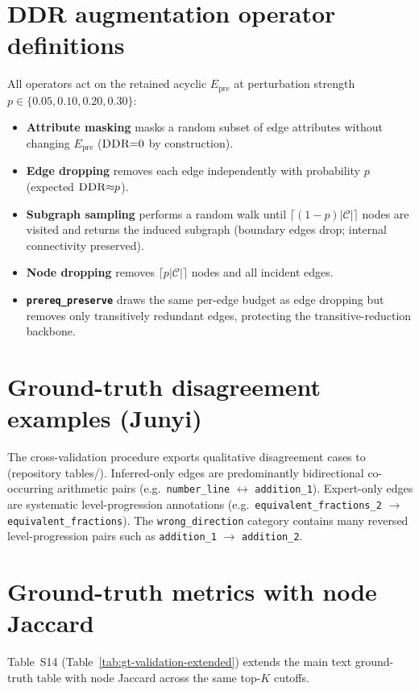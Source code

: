 \documentclass[preprint,11pt]{elsarticle}
\newcommand{\Epre}{\ensuremath{E_{\text{pre}}}}
\newcommand{\DDR}{\textsc{DDR}}
\begin{document}
\section{DDR augmentation operator definitions}
\label{sec:supp-operators}
All operators act on the retained acyclic $\Epre$ at perturbation strength
$p\in\{0.05,0.10,0.20,0.30\}$:
\begin{itemize}
  \item \textbf{Attribute masking} masks a random subset of edge attributes
  without changing $\Epre$ ($\DDR{=}0$ by construction).
  \item \textbf{Edge dropping} removes each edge independently with probability
  $p$ (expected $\DDR{\approx}p$).
  \item \textbf{Subgraph sampling} performs a random walk until
  $\lceil(1-p)|\mathcal{C}|\rceil$ nodes are visited and returns the induced
  subgraph (boundary edges drop; internal connectivity preserved).
  \item \textbf{Node dropping} removes $\lceil p|\mathcal{C}|\rceil$ nodes and
  all incident edges.
  \item \textbf{\texttt{prereq\_preserve}} draws the same per-edge budget as
  edge dropping but removes only transitively redundant edges, protecting the
  transitive-reduction backbone.
\end{itemize}

\section{Ground-truth disagreement examples (Junyi)}
\label{sec:supp-disagreement}
The cross-validation procedure exports qualitative disagreement cases to
 (repository tables/). Inferred-only edges are
predominantly bidirectional co-occurring arithmetic pairs (e.g.\
\texttt{number\_line} $\leftrightarrow$ \texttt{addition\_1}). Expert-only
edges are systematic level-progression annotations (e.g.\
\texttt{equivalent\_fractions\_2} $\rightarrow$ \texttt{equivalent\_fractions}).
The \texttt{wrong\_direction} category contains many reversed level-progression
pairs such as \texttt{addition\_1} $\rightarrow$ \texttt{addition\_2}.

\section{Ground-truth metrics with node Jaccard}
\label{sec:supp-gtxv-extended}
Table~S14 (Table~\ref{tab:gt-validation-extended}) extends the main text
ground-truth table with node Jaccard across the same top-$K$ cutoffs.
\end{document}
